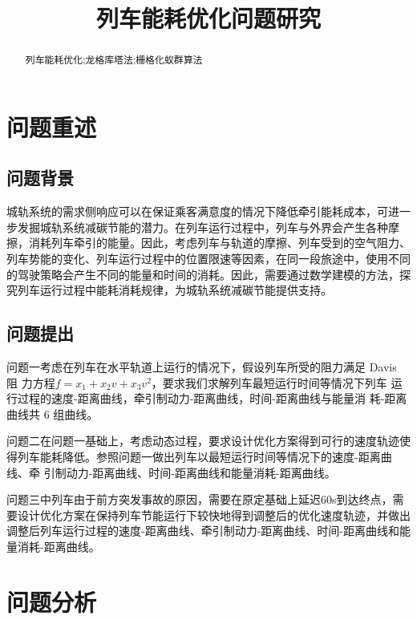 \documentclass[12pt,a4paper]{nmmcm}
\title{列车能耗优化问题研究}
\date{}
\begin{document}
\begin{abstract}


\begin{keywords}
{\song\xiaosihao
{列车能耗优化;龙格库塔法;栅格化蚁群算法}}
\end{keywords}
\end{abstract}
\maketitle
\renewcommand{\contentsname}{\centerline{\sanhao\bfseries\HEI 目\quad 录}}
\tableofcontents

\newpage
\setcounter{page}{1}
\pagestyle{fancy}
\section{问题重述}
\subsection{问题背景}
城轨系统的需求侧响应可以在保证乘客满意度的情况下降低牵引能耗成本，可进一步发掘城轨系统减碳节能的潜力。在列车运行过程中，列车与外界会产生各种摩擦，消耗列车牵引的能量。因此，考虑列车与轨道的摩擦、列车受到的空气阻力、列车势能的变化、列车运行过程中的位置限速等因素，在同一段旅途中，使用不同的驾驶策略会产生不同的能量和时间的消耗。因此，需要通过数学建模的方法，探究列车运行过程中能耗消耗规律，为城轨系统减碳节能提供支持。
\subsection{问题提出}
问题一考虑在列车在水平轨道上运行的情况下，假设列车所受的阻力满足 Davis 阻
力方程$ f = x_1 + x_2v + x_3v^2$，要求我们求解列车最短运行时间等情况下列车
运行过程的速度-距离曲线，牵引制动力-距离曲线，时间-距离曲线与能量消
耗-距离曲线共 6 组曲线。

问题二在问题一基础上，考虑动态过程，要求设计优化方案得到可行的速度轨迹使得列车能耗降低。参照问题一做出列车以最短运行时间等情况下的速度-距离曲线、牵
引制动力-距离曲线、时间-距离曲线和能量消耗-距离曲线。

问题三中列车由于前方突发事故的原因，需要在原定基础上延迟60s到达终点，需要设计优化方案在保持列车节能运行下较快地得到调整后的优化速度轨迹，并做出调整后列车运行过程的速度-距离曲线、牵引制动力-距离曲线、时间-距离曲线和能量消耗-距离曲线。
\section{问题分析}
\end{document}
